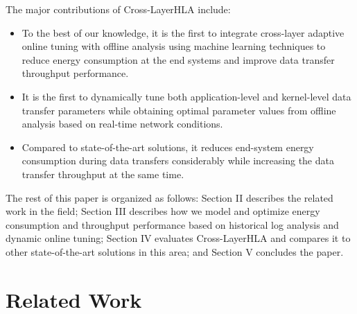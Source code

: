 \documentclass[conference]{IEEEtran}
\begin{document}
The major contributions of Cross-LayerHLA include: 
\begin{itemize}
    \item To the best of our knowledge, it is the first to integrate cross-layer adaptive online tuning with offline analysis using machine learning techniques to reduce energy consumption at the end systems and improve data transfer throughput performance.
    \item It is the first to dynamically tune both application-level and kernel-level data transfer parameters while obtaining optimal parameter values from offline analysis based on real-time network conditions.
    \item Compared to state-of-the-art solutions, it reduces end-system energy consumption during data transfers considerably while increasing the data transfer throughput at the same time.
\end{itemize}
 
The rest of this paper is organized as follows: Section \textrm{II} describes the related work in the field; 
Section \textrm{III} describes how we model and optimize energy consumption and throughput performance based on historical log analysis and dynamic online tuning;   Section \textrm{IV} evaluates Cross-LayerHLA and compares it to other state-of-the-art solutions in this area;  and Section \textrm{V} concludes the paper. 

\section{Related Work}
\end{document}
